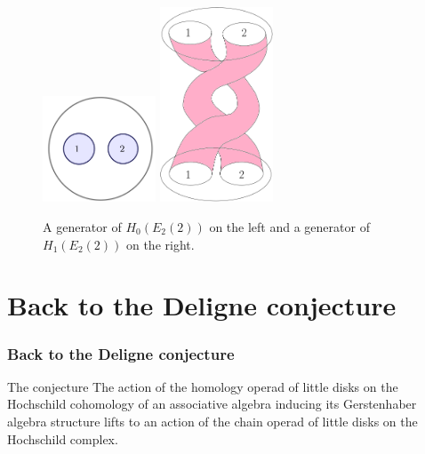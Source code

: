 \documentclass{beamer}
\theoremstyle{definition}
\begin{document}
\begin{frame}
\begin{figure}
	\includegraphics[width=0.3\textwidth]{Imagenes/genera}
	\includegraphics[width=0.3\textwidth]{Imagenes/generador}
	\caption{A generator of $H_0(E_2(2))$ on the left and a generator of $H_1(E_2(2))$ on the right.}
\end{figure}
\end{frame}

\section{Back to the Deligne conjecture}

\begin{frame}
	\frametitle{Back to the Deligne conjecture}
	\begin{block}{The conjecture}
		The action of the homology operad of little disks on the Hochschild cohomology of an associative algebra inducing its Gerstenhaber algebra structure lifts to an action of the chain operad of little disks on the Hochschild complex.
	\end{block}
	\end{frame}
\end{document}
